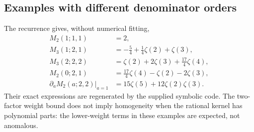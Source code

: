 \subsection{Examples with different denominator orders}
The recurrence gives, without numerical fitting,
\begin{align}
 M_2(1;1,1)&=2,\label{bmh:eq:kernel-example1}\\
 M_3(1;2,1)&=-\frac54+\frac14\zeta(2)+\zeta(3),\label{bmh:eq:kernel-example2}\\
 M_3(2;2,2)&=\zeta(2)+2\zeta(3)+\frac{17}{4}\zeta(4),\label{bmh:eq:kernel-example3}\\
 M_2(0;2,1)&=\frac{17}{4}\zeta(4)-\zeta(2)-2\zeta(3),\label{bmh:eq:kernel-example4}\\
 \left.\partial_a M_2(a;2,2)\right|_{a=1}
 &=15\zeta(5)+12\zeta(2)\zeta(3).\label{bmh:eq:kernel-example5}
\end{align}
Their exact expressions are regenerated by the supplied symbolic code.
The two-factor weight bound does not imply homogeneity when the rational
kernel has polynomial parts: the lower-weight terms in these examples
are expected, not anomalous.
